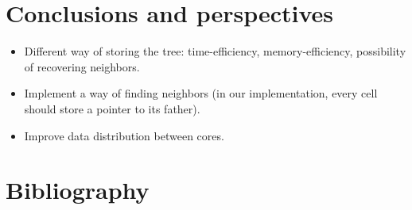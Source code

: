 \documentclass[8pt]{beamer}
\begin{document}
\section{Conclusions and perspectives}

\begin{frame}
 \begin{itemize}
  \item Different way of storing the tree: time-efficiency, memory-efficiency, possibility of recovering neighbors.
  \item Implement a way of finding neighbors (in our implementation, every cell should store a pointer to its father).
  \item Improve data distribution between cores.
 \end{itemize}

\end{frame}


\section{Bibliography}
\end{document}
